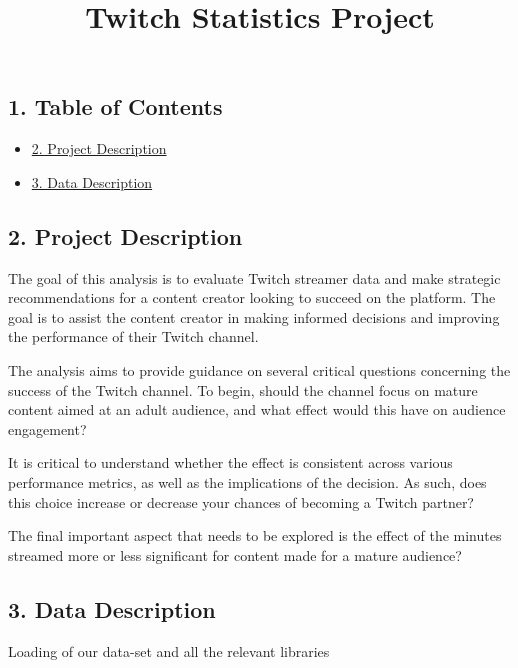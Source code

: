 \documentclass[
]{article}
\title{Twitch Statistics Project}
\author{}
\date{\vspace{-2.5em}}
\providecommand{\tightlist}{%
  \setlength{\itemsep}{0pt}\setlength{\parskip}{0pt}}
\begin{document}
\maketitle

\hypertarget{table-of-contents}{%
\subsection{1. Table of Contents}\label{table-of-contents}}

\begin{itemize}
\tightlist
\item
  \protect\hyperlink{project-description}{2. Project Description}
\item
  \protect\hyperlink{data-description}{3. Data Description}
\end{itemize}

\hypertarget{project-description}{%
\subsection{2. Project Description}\label{project-description}}

The goal of this analysis is to evaluate Twitch streamer data and make
strategic recommendations for a content creator looking to succeed on
the platform. The goal is to assist the content creator in making
informed decisions and improving the performance of their Twitch
channel.

The analysis aims to provide guidance on several critical questions
concerning the success of the Twitch channel. To begin, should the
channel focus on mature content aimed at an adult audience, and what
effect would this have on audience engagement?

It is critical to understand whether the effect is consistent across
various performance metrics, as well as the implications of the
decision. As such, does this choice increase or decrease your chances of
becoming a Twitch partner?

The final important aspect that needs to be explored is the effect of
the minutes streamed more or less significant for content made for a
mature audience?

\hypertarget{data-description}{%
\subsection{3. Data Description}\label{data-description}}

Loading of our data-set and all the relevant libraries
\end{document}
